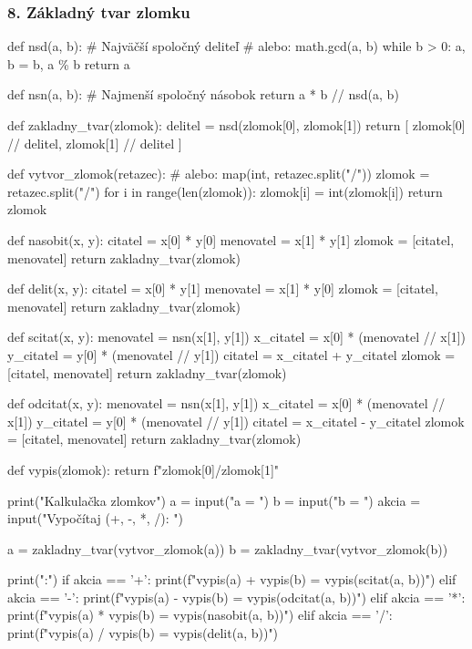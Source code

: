 \subsubsection*{8. Základný tvar zlomku}
\begin{solution}
def nsd(a, b):
    # Najväčší spoločný deliteľ
    # alebo: math.gcd(a, b)
    while b > 0:
        a, b = b, a \% b
    return a

def nsn(a, b):
    # Najmenší spoločný násobok
    return a * b // nsd(a, b)

def zakladny_tvar(zlomok):
    delitel = nsd(zlomok[0], zlomok[1])
    return [
        zlomok[0] // delitel,
        zlomok[1] // delitel
    ]

def vytvor_zlomok(retazec):
    # alebo: map(int, retazec.split("/"))
    zlomok = retazec.split("/")
    for i in range(len(zlomok)):
        zlomok[i] = int(zlomok[i])
    return zlomok

def nasobit(x, y):
    citatel = x[0] * y[0]
    menovatel = x[1] * y[1]
    zlomok = [citatel, menovatel]
    return zakladny_tvar(zlomok)

def delit(x, y):
    citatel = x[0] * y[1]
    menovatel = x[1] * y[0]
    zlomok = [citatel, menovatel]
    return zakladny_tvar(zlomok)

def scitat(x, y):
    menovatel = nsn(x[1], y[1])
    x_citatel = x[0] * (menovatel // x[1])
    y_citatel = y[0] * (menovatel // y[1])
    citatel = x_citatel + y_citatel
    zlomok = [citatel, menovatel]
    return zakladny_tvar(zlomok)

def odcitat(x, y):
    menovatel = nsn(x[1], y[1])
    x_citatel = x[0] * (menovatel // x[1])
    y_citatel = y[0] * (menovatel // y[1])
    citatel = x_citatel - y_citatel
    zlomok = [citatel, menovatel]
    return zakladny_tvar(zlomok)

def vypis(zlomok):
    return f"{zlomok[0]}/{zlomok[1]}"


print("Kalkulačka zlomkov")
a = input("a = ")
b = input("b = ")
akcia = input("Vypočítaj (+, -, *, /): ")

a = zakladny_tvar(vytvor_zlomok(a))
b = zakladny_tvar(vytvor_zlomok(b))

print(":")
if akcia == '+':
    print(f"{vypis(a)} + {vypis(b)} = {vypis(scitat(a, b))}")
elif akcia == '-':
    print(f"{vypis(a)} - {vypis(b)} = {vypis(odcitat(a, b))}")
elif akcia == '*':
    print(f"{vypis(a)} * {vypis(b)} = {vypis(nasobit(a, b))}")
elif akcia == '/':
    print(f"{vypis(a)} / {vypis(b)} = {vypis(delit(a, b))}")

\end{solution}
